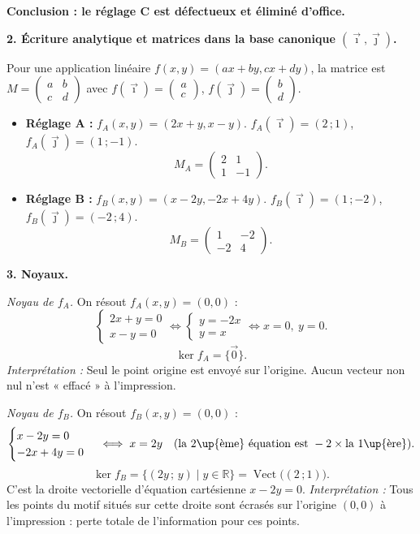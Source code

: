 \documentclass[11pt]{article}
\begin{document}
\begin{exoresolu}
\textbf{Conclusion : le réglage C est défectueux et éliminé d'office.}

\medskip

\textbf{2. Écriture analytique et matrices dans la base canonique $(\vec{\imath},\vec{\jmath})$.}

Pour une application linéaire $f(x,y) = (ax+by, cx+dy)$, la matrice est $M = \begin{pmatrix} a & b \\ c & d \end{pmatrix}$ avec $f(\vec{\imath}) = \begin{pmatrix} a \\ c \end{pmatrix}$, $f(\vec{\jmath}) = \begin{pmatrix} b \\ d \end{pmatrix}$.

\begin{itemize}
\item \textbf{Réglage A :} $f_A(x,y) = (2x+y, x-y)$.
$f_A(\vec{\imath}) = (2\,;1)$, $f_A(\vec{\jmath}) = (1\,;-1)$.
\[ M_A = \begin{pmatrix} 2 & 1 \\ 1 & -1 \end{pmatrix}. \]
\item \textbf{Réglage B :} $f_B(x,y) = (x-2y, -2x+4y)$.
$f_B(\vec{\imath}) = (1\,;-2)$, $f_B(\vec{\jmath}) = (-2\,;4)$.
\[ M_B = \begin{pmatrix} 1 & -2 \\ -2 & 4 \end{pmatrix}. \]
\end{itemize}

\medskip

\textbf{3. Noyaux.}

\emph{Noyau de $f_A$.} On résout $f_A(x,y) = (0,0)$ :
\[ \begin{cases} 2x + y = 0 \\ x - y = 0 \end{cases} \iff \begin{cases} y = -2x \\ y = x \end{cases} \iff x = 0,\ y = 0. \]
\[ \ker f_A = \{\vec{0}\}. \]
\textit{Interprétation :} Seul le point origine est envoyé sur l'origine. Aucun vecteur non nul n'est « effacé » à l'impression.

\emph{Noyau de $f_B$.} On résout $f_B(x,y) = (0,0)$ :
\[ \begin{cases} x - 2y = 0 \\ -2x + 4y = 0 \end{cases} \iff x = 2y \quad (\text{la 2\up{ème} équation est } -2 \times \text{la 1\up{ère}}). \]
\[ \ker f_B = \{(2y\,;\,y) \mid y \in \mathbb{R}\} = \operatorname{Vect}\bigl((2\,;1)\bigr). \]
C'est la droite vectorielle d'équation cartésienne $x - 2y = 0$.
\textit{Interprétation :} Tous les points du motif situés sur cette droite sont écrasés sur l'origine $(0,0)$ à l'impression : perte totale de l'information pour ces points.


\end{exoresolu}
\end{document}
